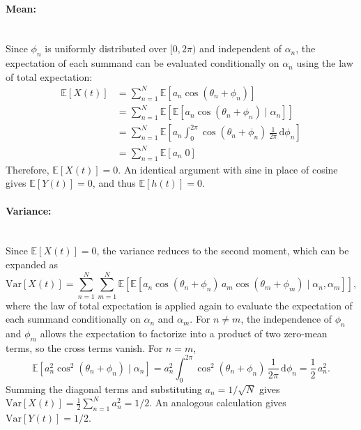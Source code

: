 \paragraph*{Mean:}~\\
Since $\phi_n$ is uniformly distributed over $[0, 2\pi)$ and independent of $\alpha_n$, the expectation of each summand can be evaluated conditionally on $\alpha_n$ using the law of total expectation:
\begin{subequations}
\begin{align}
    \mathbb{E}\!\left[X(t)\right]
    &= \sum_{n=1}^{N} \mathbb{E}\!\left[a_n \cos(\theta_n + \phi_n)\right] \\
    &= \sum_{n=1}^{N} \mathbb{E}\!\left[\mathbb{E}\!\left[a_n \cos(\theta_n + \phi_n) \mid \alpha_n\right]\right] \\
    &= \sum_{n=1}^{N} \mathbb{E}\!\left[a_n \int_{0}^{2\pi} \cos(\theta_n + \phi_n)\,\frac{1}{2\pi}\,\mathrm{d}\phi_n\right] \\
    &= \sum_{n=1}^{N} \mathbb{E}\!\left[a_n \; 0\right]
\end{align}
\end{subequations}
Therefore, $\mathbb{E}[X(t)] = 0$.
An identical argument with sine in place of cosine gives $\mathbb{E}[Y(t)] = 0$, and thus $\mathbb{E}[h(t)] = 0$.

\paragraph*{Variance:}~\\
Since $\mathbb{E}[X(t)] = 0$, the variance reduces to the second moment, which can be expanded as
\begin{equation}
    \mathrm{Var}[X(t)]
    = \sum_{n=1}^{N}\sum_{m=1}^{N}
      \mathbb{E}\!\left[\mathbb{E}\!\left[a_n \cos(\theta_n + \phi_n) \, a_m \cos(\theta_m + \phi_m) \mid \alpha_n, \alpha_m\right]\right],
\end{equation}
where the law of total expectation is applied again to evaluate the expectation of each summand conditionally on $\alpha_n$ and $\alpha_m$.
For $n \neq m$, the independence of $\phi_n$ and $\phi_m$ allows the expectation to factorize into a product of two zero-mean terms, so the cross terms vanish.
For $n = m$,
\begin{equation}
    \mathbb{E}\!\left[a_n^2 \cos^2(\theta_n + \phi_n) \mid \alpha_n\right]
    = a_n^2 \int_{0}^{2\pi} \cos^2(\theta_n + \phi_n)\,\frac{1}{2\pi}\,\mathrm{d}\phi_n
    = \frac{1}{2} \, a_n^2.
\end{equation}
Summing the diagonal terms and substituting $a_n = 1/\sqrt{N}$ gives $\mathrm{Var}[X(t)] = \frac{1}{2} \sum_{n=1}^{N} a_n^2 = 1/2$.
An analogous calculation gives $\mathrm{Var}[Y(t)] = 1/2$.

